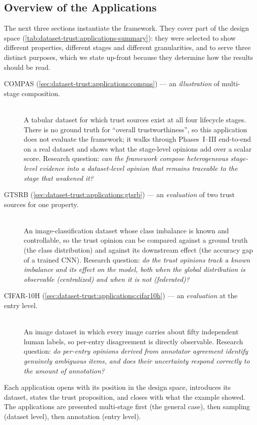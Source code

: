 \subsection{Overview of the Applications}
\label{sec:dataset-trust:framework:applications-overview}
The next three sections instantiate the framework. They cover part of the design space (\cref{tab:dataset-trust:applications-summary}): they were selected to show different properties, different stages and different granularities, and to serve three distinct purposes, which we state up-front because they determine how the results should be read.

\begin{description}
  \item[\ac{COMPAS} (\cref{sec:dataset-trust:applications:compas}) --- an \emph{illustration} of multi-stage composition.]\hfill\\ A tabular dataset for which trust sources exist at all four lifecycle stages. There is no ground truth for ``overall trustworthiness'', so this application does not evaluate the framework; it walks through Phases~I--III end-to-end on a real dataset and shows what the stage-level opinions add over a scalar score. Research question: \emph{can the framework compose heterogeneous stage-level evidence into a dataset-level opinion that remains traceable to the stage that weakened it?}
  \item[\ac{GTSRB} (\cref{sec:dataset-trust:applications:gtsrb}) --- an \emph{evaluation} of two trust sources for one property.]\hfill\\ An image-classification dataset whose class imbalance is known and controllable, so the trust opinion can be compared against a ground truth (the class distribution) and against its downstream effect (the accuracy gap of a trained \ac{CNN}). Research question: \emph{do the trust opinions track a known imbalance and its effect on the model, both when the global distribution is observable (centralized) and when it is not (federated)?}
  \item[CIFAR-10H (\cref{sec:dataset-trust:applications:cifar10h}) --- an \emph{evaluation} at the entry level.]\hfill\\ An image dataset in which every image carries about fifty independent human labels, so per-entry disagreement is directly observable. Research question: \emph{do per-entry opinions derived from annotator agreement identify genuinely ambiguous items, and does their uncertainty respond correctly to the amount of annotation?}
\end{description}
Each application opens with its position in the design space, introduces its dataset, states the trust proposition, and closes with what the example showed. The applications are presented multi-stage first (the general case), then sampling (dataset level), then annotation (entry level).

